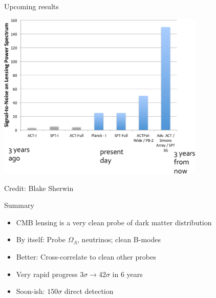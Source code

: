 \documentclass[table]{beamer}
\begin{document}
\begin{frame}{Upcoming results}
	\begin{center}
		\includegraphics[height=8cm]{plots/cmb_lensing_past_future_blake.png}

		\vspace{-0.5cm}
		{\footnotesize Credit: Blake Sherwin}
	\end{center}
\end{frame}

\begin{frame}{Summary}
	\begin{center}
		\begin{itemize}
			\item<2-> CMB lensing is a very clean probe of dark matter distribution
			\item<3-> By itself: Probe $\Omega_\Lambda$, neutrinos; clean B-modes
			\item<4-> Better: Cross-correlate to clean other probes
			\item<5-> Very rapid progress $3\sigma \rightarrow 42\sigma$ in 6 years
			\item<6-> Soon-ish: $150\sigma$ direct detection
		\end{itemize}
	\end{center}
\end{frame}
\end{document}
